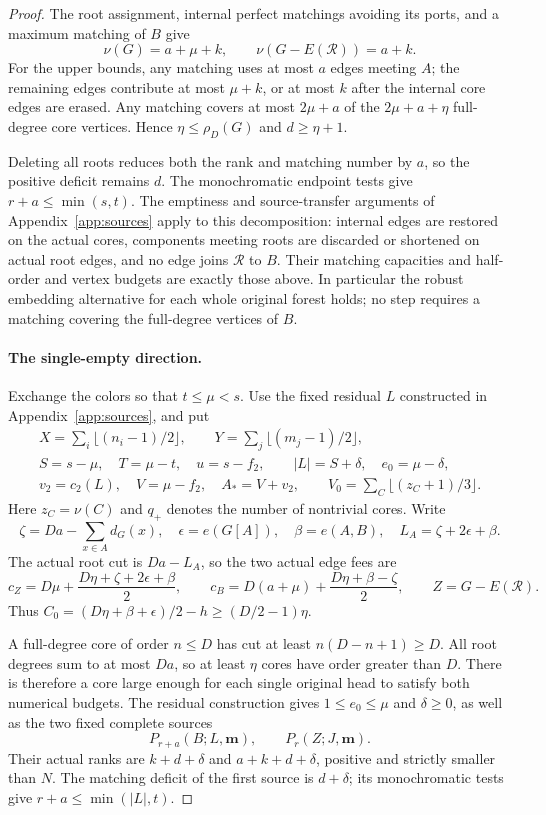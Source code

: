 \documentclass[11pt,a4paper]{article}
\theoremstyle{definition}
\begin{document}
\begin{proof}
The root assignment, internal perfect matchings avoiding its ports,
and a maximum matching of $B$ give
\[
 \nu(G)=a+\mu+k,\qquad
 \nu(G-E(\mathcal R))=a+k.
\]
For the upper bounds, any matching uses at most $a$ edges meeting $A$;
the remaining edges contribute at most $\mu+k$, or at most $k$ after
the internal core edges are erased.  Any matching covers at most
$2\mu+a$ of the $2\mu+a+\eta$ full-degree core vertices.  Hence
$\eta\le\rho_D(G)$ and $d\ge\eta+1$.

Deleting all roots reduces both the rank and matching number by $a$,
so the positive deficit remains $d$.  The monochromatic endpoint
tests give $r+a\le\min(s,t)$.  The emptiness and source-transfer
arguments of Appendix~\ref{app:sources} apply to this decomposition:
internal edges are restored on the actual cores, components meeting
roots are discarded or shortened on actual root edges, and no edge
joins $\mathcal R$ to $B$.  Their matching capacities and half-order
and vertex budgets are exactly those above.  In particular the
robust embedding alternative for each whole original forest holds;
no step requires a matching covering the full-degree vertices of $B$.

\paragraph{The single-empty direction.}
Exchange the colors so that $t\le\mu<s$.
Use the fixed residual $L$ constructed in Appendix~\ref{app:sources},
and put
\[
\begin{gathered}
 X=\sum_i\lfloor(n_i-1)/2\rfloor,\qquad
 Y=\sum_j\lfloor(m_j-1)/2\rfloor,\\
 S=s-\mu,\quad T=\mu-t,\quad u=s-f_2,\qquad
 |L|=S+\delta,\quad e_0=\mu-\delta,\\
 v_2=c_2(L),\quad V=\mu-f_2,\quad A_*=V+v_2,\qquad
 V_0=\sum_C\lfloor(z_C+1)/3\rfloor.
\end{gathered}
\]
Here $z_C=\nu(C)$ and $q_+$ denotes the number of nontrivial cores.
Write
\[
 \zeta=Da-\sum_{x\in A}d_G(x),\quad
 \epsilon=e(G[A]),\quad\beta=e(A,B),\quad
 L_A=\zeta+2\epsilon+\beta.
\]
The actual root cut is $Da-L_A$, so the two actual edge fees are
\[
 c_Z=D\mu+\frac{D\eta+\zeta+2\epsilon+\beta}{2},\qquad
 c_B=D(a+\mu)+\frac{D\eta+\beta-\zeta}{2},
 \qquad Z=G-E(\mathcal R).
\]
Thus $C_0=(D\eta+\beta+\epsilon)/2-h\ge(D/2-1)\eta$.

A full-degree core of order $n\le D$ has cut at least
$n(D-n+1)\ge D$.  All root degrees sum to at most $Da$, so at least
$\eta$ cores have order greater than $D$.
There is therefore a core large enough for each single original head
to satisfy both numerical budgets.  The residual construction gives
$1\le e_0\le\mu$ and $\delta\ge0$, as well as the two fixed complete
sources
\[
 P_{r+a}(B;L,\mathbf m),\qquad P_r(Z;J,\mathbf m).
\]
Their actual ranks are $k+d+\delta$ and $a+k+d+\delta$,
positive and strictly smaller than $N$.
The matching deficit of the first source is $d+\delta$;
its monochromatic tests give $r+a\le\min(|L|,t)$.


\end{proof}
\end{document}
